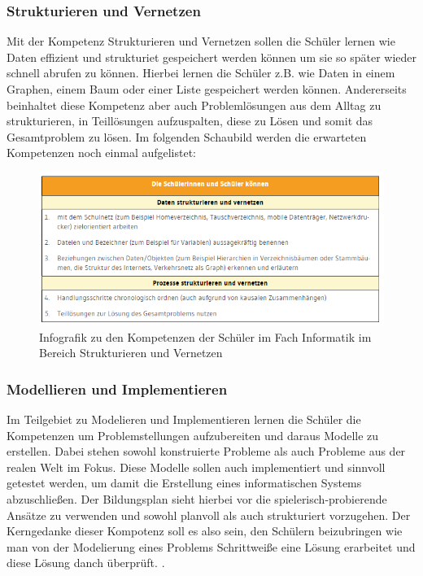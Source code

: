 \subsubsection{Strukturieren und Vernetzen}
Mit der Kompetenz Strukturieren und Vernetzen sollen die Schüler lernen wie Daten effizient und strukturiet gespeichert werden können um sie so später wieder schnell abrufen zu können. Hierbei lernen die Schüler z.B. wie Daten in einem Graphen, einem Baum oder einer Liste gespeichert werden können. Andererseits beinhaltet diese Kompetenz aber auch Problemlösungen aus dem Alltag zu strukturieren, in Teillösungen aufzuspalten, diese zu Lösen und somit das Gesamtproblem zu lösen.\cite{StruktVer} Im folgenden Schaubild werden die erwarteten Kompetenzen noch einmal aufgelistet:


\begin{figure}[H]
	\centering
	\includegraphics[width=\textwidth,height=\textheight,keepaspectratio]{images/struc.png}
	\caption{Infografik zu den Kompetenzen der Schüler im Fach Informatik im Bereich Strukturieren und Vernetzen}
	\label{Strukturieren und Vernetzen Infografik}
\end{figure}

\subsubsection{Modellieren und Implementieren}

Im Teilgebiet zu Modelieren und Implementieren lernen die Schüler die Kompetenzen um Problemstellungen aufzubereiten und daraus Modelle zu erstellen. Dabei stehen sowohl konstruierte Probleme als auch Probleme aus der realen Welt im Fokus. Diese Modelle sollen auch implementiert und sinnvoll getestet werden, um damit die Erstellung eines informatischen Systems abzuschließen. Der Bildungsplan sieht hierbei vor die spielerisch-probierende Ansätze zu verwenden und sowohl planvoll als auch strukturiert vorzugehen. Der Kerngedanke dieser Kompotenz soll es also sein, den Schülern beizubringen wie man von der Modelierung eines Problems Schrittweiße eine Lösung erarbeitet und diese Lösung danch überprüft. \cite{Model}.


